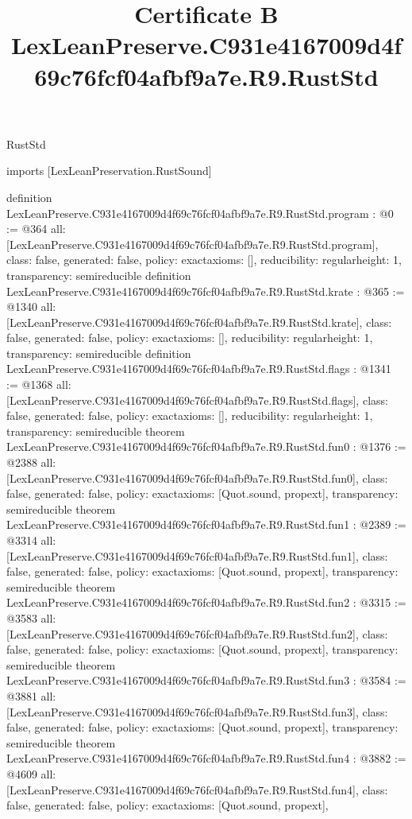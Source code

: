\begin{lexlean}{RustStd}
\title{Certificate B LexLeanPreserve.C931e4167009d4f69c76fcf04afbf9a7e.R9.RustStd}
\begin{coremodule}
imports [LexLeanPreservation.RustSound]

definition LexLeanPreserve.C931e4167009d4f69c76fcf04afbf9a7e.R9.RustStd.program : @0 := @364 {
  all: [LexLeanPreserve.C931e4167009d4f69c76fcf04afbf9a7e.R9.RustStd.program],
  class: false,
  generated: false,
  policy: exact{axioms: []},
  reducibility: regular{height: 1},
  transparency: semireducible
}
definition LexLeanPreserve.C931e4167009d4f69c76fcf04afbf9a7e.R9.RustStd.krate : @365 := @1340 {
  all: [LexLeanPreserve.C931e4167009d4f69c76fcf04afbf9a7e.R9.RustStd.krate],
  class: false,
  generated: false,
  policy: exact{axioms: []},
  reducibility: regular{height: 1},
  transparency: semireducible
}
definition LexLeanPreserve.C931e4167009d4f69c76fcf04afbf9a7e.R9.RustStd.flags : @1341 := @1368 {
  all: [LexLeanPreserve.C931e4167009d4f69c76fcf04afbf9a7e.R9.RustStd.flags],
  class: false,
  generated: false,
  policy: exact{axioms: []},
  reducibility: regular{height: 1},
  transparency: semireducible
}
theorem LexLeanPreserve.C931e4167009d4f69c76fcf04afbf9a7e.R9.RustStd.fun0 : @1376 := @2388 {
  all: [LexLeanPreserve.C931e4167009d4f69c76fcf04afbf9a7e.R9.RustStd.fun0],
  class: false,
  generated: false,
  policy: exact{axioms: [Quot.sound, propext]},
  transparency: semireducible
}
theorem LexLeanPreserve.C931e4167009d4f69c76fcf04afbf9a7e.R9.RustStd.fun1 : @2389 := @3314 {
  all: [LexLeanPreserve.C931e4167009d4f69c76fcf04afbf9a7e.R9.RustStd.fun1],
  class: false,
  generated: false,
  policy: exact{axioms: [Quot.sound, propext]},
  transparency: semireducible
}
theorem LexLeanPreserve.C931e4167009d4f69c76fcf04afbf9a7e.R9.RustStd.fun2 : @3315 := @3583 {
  all: [LexLeanPreserve.C931e4167009d4f69c76fcf04afbf9a7e.R9.RustStd.fun2],
  class: false,
  generated: false,
  policy: exact{axioms: [Quot.sound, propext]},
  transparency: semireducible
}
theorem LexLeanPreserve.C931e4167009d4f69c76fcf04afbf9a7e.R9.RustStd.fun3 : @3584 := @3881 {
  all: [LexLeanPreserve.C931e4167009d4f69c76fcf04afbf9a7e.R9.RustStd.fun3],
  class: false,
  generated: false,
  policy: exact{axioms: [Quot.sound, propext]},
  transparency: semireducible
}
theorem LexLeanPreserve.C931e4167009d4f69c76fcf04afbf9a7e.R9.RustStd.fun4 : @3882 := @4609 {
  all: [LexLeanPreserve.C931e4167009d4f69c76fcf04afbf9a7e.R9.RustStd.fun4],
  class: false,
  generated: false,
  policy: exact{axioms: [Quot.sound, propext]},
}
\end{coremodule}
\end{lexlean}
